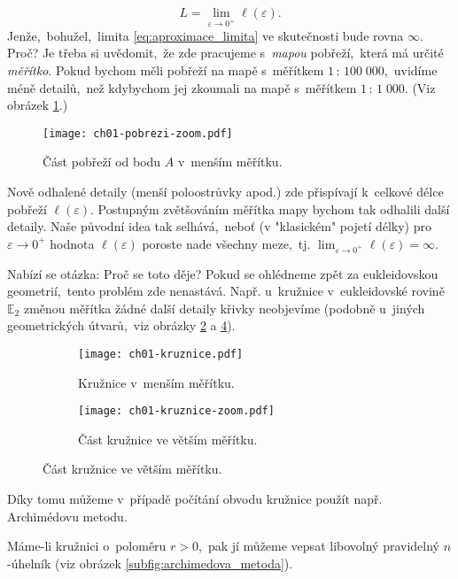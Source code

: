 \begin{equation}\label{eq:aproximace_limita}
    L=\lim_{\varepsilon\to0^+}{\ell(\varepsilon)}.
\end{equation}
Jenže,~bohužel,~limita \eqref{eq:aproximace_limita} ve skutečnosti bude rovna $\infty$. Proč? Je třeba si uvědomit,~že zde pracujeme s~\emph{mapou} pobřeží,~která má určité \emph{měřítko}. Pokud bychom měli pobřeží na mapě s~měřítkem $1\,:\,100\;000$,~uvidíme méně detailů,~než kdybychom jej zkoumali na mapě s~měřítkem $1\,:\,1\;000$. (Viz obrázek \ref{fig:pobrezi_zoom}.)\par
\begin{figure}[h]
    \centering
    \texttt{[image: ch01-pobrezi-zoom.pdf]}
    \caption{Část pobřeží od bodu $A$ v~menším měřítku.}
    \label{fig:pobrezi_zoom}
\end{figure}
Nově odhalené detaily (menší poloostrůvky apod.) zde přispívají k~celkové délce pobřeží $\ell(\varepsilon)$. Postupným zvětšováním měřítka mapy bychom tak odhalili další detaily. Naše původní idea tak selhává,~neboť (v "klasickém" pojetí délky) pro $\varepsilon\to0^+$ hodnota $\ell(\varepsilon)$ poroste nade všechny meze,~tj. $\lim_{\varepsilon\to0^+}{\ell(\varepsilon)}=\infty$.\par
Nabízí se otázka: Proč se toto děje? Pokud se ohlédneme zpět za eukleidovskou geometrií,~tento problém zde nenastává. Např. u~kružnice v~eukleidovské rovině $\mathbb{E}_2$ změnou měřítka žádné další detaily křivky neobjevíme (podobně u~jiných geometrických útvarů,~viz obrázky \ref{subfig:kruznice} a \ref{subfig:kruznice_zoom}). 
\begin{figure}[h]
    \centering
    \begin{subfigure}{\subfigwidth}
        \centering
        \texttt{[image: ch01-kruznice.pdf]}
        \caption{Kružnice v~menším měřítku.}
        \label{subfig:kruznice}
    \end{subfigure}
    \quad
    \begin{subfigure}{\subfigwidth}
        \centering
        \texttt{[image: ch01-kruznice-zoom.pdf]}
        \caption{Část kružnice ve větším měřítku.}
        \label{subfig:kruznice_zoom}
    \end{subfigure}
\end{figure}
Díky tomu můžeme v~případě počítání obvodu kružnice použít např. Archimédovu metodu.\par
Máme-li kružnici o~poloměru $r>0$,~pak jí můžeme vepsat libovolný pravidelný $n$-úhelník (viz obrázek \ref{subfig:archimedova_metoda}).
